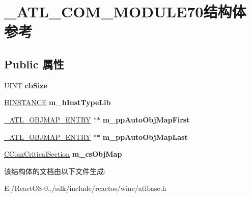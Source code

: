 \hypertarget{struct___a_t_l___c_o_m___m_o_d_u_l_e70}{}\section{\+\_\+\+A\+T\+L\+\_\+\+C\+O\+M\+\_\+\+M\+O\+D\+U\+L\+E70结构体 参考}
\label{struct___a_t_l___c_o_m___m_o_d_u_l_e70}
\subsection*{Public 属性}
\begin{DoxyCompactItemize}
\item 
\mbox{\label{struct___a_t_l___c_o_m___m_o_d_u_l_e70_a3bb11e81b5182f5b076fda61e9bb1579}} 
U\+I\+NT {\bfseries cb\+Size}
\item 
\mbox{\label{struct___a_t_l___c_o_m___m_o_d_u_l_e70_a578b7519b5bad5dc060fa798e8a3e73b}} 
\hyperlink{interfacevoid}{H\+I\+N\+S\+T\+A\+N\+CE} {\bfseries m\+\_\+h\+Inst\+Type\+Lib}
\item 
\mbox{\label{struct___a_t_l___c_o_m___m_o_d_u_l_e70_a243cbfbde1238322135ef55e62352831}} 
\hyperlink{struct___a_t_l___o_b_j_m_a_p___e_n_t_r_y_w___t_a_g}{\+\_\+\+A\+T\+L\+\_\+\+O\+B\+J\+M\+A\+P\+\_\+\+E\+N\+T\+RY} $\ast$$\ast$ {\bfseries m\+\_\+pp\+Auto\+Obj\+Map\+First}
\item 
\mbox{\label{struct___a_t_l___c_o_m___m_o_d_u_l_e70_a721119f084ec6b28c9a8b7a2bef54f2a}} 
\hyperlink{struct___a_t_l___o_b_j_m_a_p___e_n_t_r_y_w___t_a_g}{\+\_\+\+A\+T\+L\+\_\+\+O\+B\+J\+M\+A\+P\+\_\+\+E\+N\+T\+RY} $\ast$$\ast$ {\bfseries m\+\_\+pp\+Auto\+Obj\+Map\+Last}
\item 
\mbox{\label{struct___a_t_l___c_o_m___m_o_d_u_l_e70_adb85f1320a735a84a92f3c12cc8f18cb}} 
\hyperlink{struct___c_r_i_t_i_c_a_l___s_e_c_t_i_o_n}{C\+Com\+Critical\+Section} {\bfseries m\+\_\+cs\+Obj\+Map}
\end{DoxyCompactItemize}


该结构体的文档由以下文件生成\+:\begin{DoxyCompactItemize}
\item 
E\+:/\+React\+O\+S-\/0../sdk/include/reactos/wine/atlbase.\+h\end{DoxyCompactItemize}
